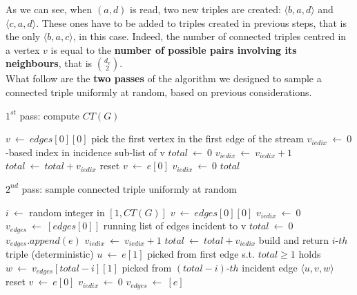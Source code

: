 \noindent As we can see, when $(a,d)$ is read, two new triples are created: $\langle b,a,d\rangle$ and $\langle c,a,d\rangle$. These ones have to be added to triples created in previous steps, that is the only $\langle b,a,c\rangle$, in this case. Indeed, the number of connected triples centred in a vertex $v$ is equal to the \textbf{number of possible pairs involving its neighbours}, that is $\binom{d_v}{2}$.\\
What follow are the \textbf{two passes} of the algorithm we designed to sample a connected triple uniformly at random, based on previous considerations.
\medskip
\begin{algorithm}
	\caption{$1^{st}$ pass: compute $CT(G)$}
	\begin{algorithmic}[1]
		\State $v \ \leftarrow \ edges[0][0]$ \Comment pick the first vertex in the first edge of the stream
		\State $v_{iedix} \ \leftarrow \ 0$ -based index in incidence sub-list of v
		\State $total \ \leftarrow \ 0$
				\State $v_{iedix} \ \leftarrow \ v_{iedix} + 1$
				\State $total \ \leftarrow \ total + v_{iedix}$
			\Else \Comment reset
				\State $v \ \leftarrow \ e[0]$
				\State $v_{iedix} \ \leftarrow \ 0$
			\EndIf
		\EndFor
		\State \Return $total$
	\end{algorithmic}
\end{algorithm}

\newpage
\begin{algorithm}
	\caption{$2^{nd}$ pass: sample connected triple uniformly at random}
	\begin{algorithmic}[1]
		\State $i \ \leftarrow$ random integer in $[1, CT(G)]$
		\State $v \ \leftarrow \ edges[0][0]$
		\State $v_{iedix} \ \leftarrow \ 0$
		\State $v_{edges} \ \leftarrow \ [edges[0]]$ \Comment running list of edges incident to v
		\State $total \ \leftarrow \ 0$
				\State $v_{edges}.append(e)$
				\State $v_{iedix} \ \leftarrow \ v_{iedix} + 1$
				\State $total \ \leftarrow \ total + v_{iedix}$
				 \Comment build and return $i\text{-}th$ triple (deterministic)
					\State $u \ \leftarrow \ e[1]$ \Comment picked from first edge s.t. $total \ge 1$ holds
					\State $w \ \leftarrow \ v_{edges}[total-i][1]$ \Comment picked from $(total-i)\text{-}th$ incident edge
					\State \Return $\langle u,v,w \rangle$
				\EndIf
			\Else \Comment reset
				\State $v \ \leftarrow \ e[0]$
				\State $v_{iedix} \ \leftarrow \ 0$
				\State $v_{edges} \ \leftarrow \ [e]$
			\EndIf
		\EndFor
	\end{algorithmic}
\end{algorithm}




